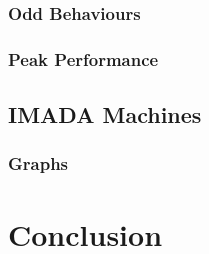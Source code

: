 \documentclass[a4paper,11pt,oneside]{book}
\begin{document}

\subsection{Odd Behaviours}


\subsection{Peak Performance}


\section{IMADA Machines}
\subsection{Graphs}


\chapter{Conclusion}


\end{document}
